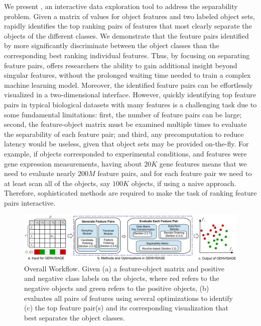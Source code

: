 We present \genviz, 
an interactive data exploration tool to address the separability problem.
Given a matrix of values for object features 
and two labeled object sets, \genviz rapidly identifies 
the top ranking pairs of features 
that most clearly separate the objects of 
the different classes. 
We demonstrate that the feature pairs identified by \genviz more significantly
discriminate between the object classes than the corresponding
best ranking individual features. 
Thus, by focusing on separating feature pairs, \genviz
offers researchers the ability to gain additional
insight beyond singular features, without the prolonged waiting time
needed to train a complex machine learning model. 
Moreover, the identified feature pairs can be effortlessly
visualized in a two-dimensional interface.
However, quickly identifying top feature pairs 
in typical biological datasets with many features
is a challenging task due to some fundamental limitations:
first, the number of feature pairs can be large;
second, the feature-object matrix must be examined
multiple times to evaluate the separability of
each feature pair;
and third, any precomputation to reduce latency
would be useless, given that
object sets may be provided on-the-fly. 
For example, if objects corresponded to experimental
conditions, and features were gene expression measurements,
having about $20K$ gene features 
means that we need to evaluate nearly $200M$ feature pairs, 
and for each feature pair we need to at least scan all of the objects, 
say $100K$ objects, if using a naive approach. 
Therefore, sophisticated methods are required 
to make the task of ranking feature pairs interactive.

\begin{figure}[t]
 \centering
 \includegraphics[width=0.9\linewidth]{fig/workflow2.pdf}
 \vspace{-10pt}
\caption{Overall \genviz Workflow. 
Given (a) a feature-object matrix and positive and negative class labels on the objects, where red refers to the negative objects and green refers to the positive objects, \genviz (b) evaluates all pairs of features using several optimizations to identify (c) the top feature pair(s) and its corresponding visualization that best separates the object classes.}
\label{fig:workflow}
\vspace{-10pt}
\end{figure}


